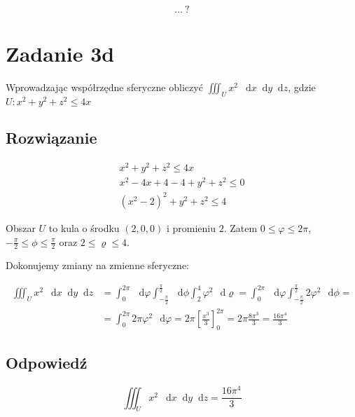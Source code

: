 \documentclass{article}
\newcommand{\diff}{\mathop{}\!\mathrm{d}}
\newcommand{\Integral}[4]{\int_{#1}^{#2} \! #3 \, \mathop{}\!\mathrm{d}#4}
\DeclareMathOperator{\?}{?}
\begin{document}
\begin{equation*}
   \ldots\ ?
\end{equation*}

\clearpage
\section*{Zadanie 3d}

Wprowadzając współrzędne sferyczne obliczyć
$\displaystyle \iiint_U x^2 \ \diff{x}\diff{y}\diff{z} $,
gdzie $U: x^2 + y^2 + z^2 \le 4x$

\subsection*{Rozwiązanie}

\begin{gather*}
   x^2 + y^2 + z^2 \le 4x \\
   x^2 - 4x + 4 - 4 + y^2 + z^2 \le 0 \\
   (x^2 - 2)^2 + y^2 + z^2 \le 4
\end{gather*}

Obszar $U$ to kula o środku $(2,0,0)$ i promieniu $2$.
Zatem $0 \le \varphi \le 2\pi$, $-\frac{\pi}{2} \le \phi \le \frac{\pi}{2}$ oraz $2 \le \varrho \le 4$.

Dokonujemy zmiany na zmienne sferyczne:

\begin{equation*}
   \begin{aligned}
      \iiint_U x^2 \ \diff{x}\diff{y}\diff{z} &=
      \Integral{0}{2\pi}{}{\varphi}
      \Integral{-\frac{\pi}{2}}{\frac{\pi}{2}}{}{\phi}
      \Integral{2}{4}{\varphi^2}{\varrho}
      =
      \Integral{0}{2\pi}{}{\varphi}
      \Integral{-\frac{\pi}{2}}{\frac{\pi}{2}}{2\varphi^2}{\phi}
      =\\ &=
      \Integral{0}{2\pi}{2\pi \varphi^2}{\varphi}
      =
      2\pi \left[\frac{x^3}{3}\right]_0^{2\pi}
      =
      2\pi \frac{8\pi^3}{3} = \frac{16\pi^4}{3}
   \end{aligned}
\end{equation*}

\subsection*{Odpowiedź}
\begin{equation*}
      \iiint_U x^2 \ \diff{x}\diff{y}\diff{z} = \frac{16\pi^4}{3}
\end{equation*}
\end{document}
